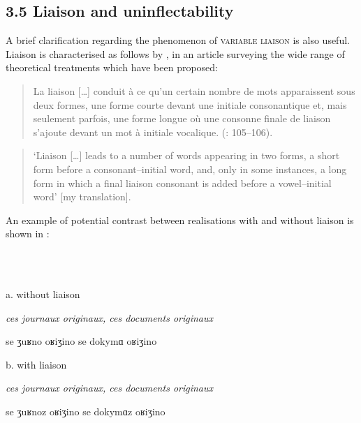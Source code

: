 \documentclass[output=paper]{langscibook}
\begin{document}
\subsection{3.5  Liaison and uninflectability}

A brief clarification regarding the phenomenon of \textsc{variable} \textsc{liaison} is also useful. Liaison is characterised as follows by \citet{DurandEtAl2011}, in an article surveying the wide range of theoretical treatments which have been proposed: 

\begin{quote}
La liaison […] conduit à ce qu’un certain nombre de mots apparaissent sous deux formes, une forme courte devant une initiale consonantique et, mais seulement parfois, une forme longue où une consonne finale de liaison s’ajoute devant un mot à initiale vocalique. (\citealt{DurandEtAl2011}: 105–106).
\end{quote}

\begin{quote}
‘Liaison […] leads to a number of words appearing in two forms, a short form before a consonant–initial word, and, only in some instances, a long form in which a final liaison consonant is added before a vowel–initial word’ [my translation].
\end{quote}

An example of potential contrast between realisations with and without liaison is shown in :

\ea%
    \label{ex:key:4}
    \gll \\
         \\
    \glt
    \z %

          a.   without liaison

\textit{ces   journaux   originaux,  ces   documents   originaux}

se  ʒuʁno    oʁiʒino   se  dokymɑ  oʁiʒino

  b.  with liaison

 \textit{ces   journaux   originaux,   ces   documents   originaux}

se  ʒuʁnoz  oʁiʒino   se  dokymɑz  oʁiʒino
\end{document}
